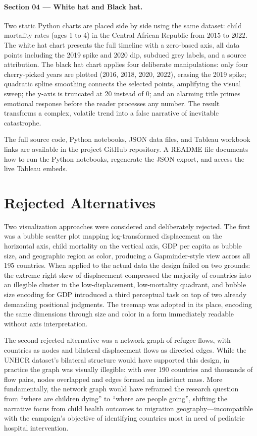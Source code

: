 \documentclass{article}
\begin{document}
\paragraph{Section 04 --- White hat and Black hat.}
Two static Python charts are placed side by side using the same dataset: child mortality rates (ages 1 to 4) in the Central African Republic from 2015 to 2022. The white hat chart presents the full timeline with a zero-based axis, all data points including the 2019 spike and 2020 dip, subdued grey labels, and a source attribution. The black hat chart applies four deliberate manipulations: only four cherry-picked years are plotted (2016, 2018, 2020, 2022), erasing the 2019 spike; quadratic spline smoothing connects the selected points, amplifying the visual sweep; the y-axis is truncated at 20 instead of 0; and an alarming title primes emotional response before the reader processes any number. The result transforms a complex, volatile trend into a false narrative of inevitable catastrophe.

The full source code, Python notebooks, JSON data files, and Tableau workbook links are available in the project GitHub repository. A README file documents how to run the Python notebooks, regenerate the JSON export, and access the live Tableau embeds.

\section{Rejected Alternatives}

Two visualization approaches were considered and deliberately rejected. The first was a bubble scatter plot mapping log-transformed displacement on the horizontal axis, child mortality on the vertical axis, GDP per capita as bubble size, and geographic region as color, producing a Gapminder-style view across all 195 countries. When applied to the actual data the design failed on two grounds: the extreme right skew of displacement compressed the majority of countries into an illegible cluster in the low-displacement, low-mortality quadrant, and bubble size encoding for GDP introduced a third perceptual task on top of two already demanding positional judgments. The treemap was adopted in its place, encoding the same dimensions through size and color in a form immediately readable without axis interpretation.

The second rejected alternative was a network graph of refugee flows, with countries as nodes and bilateral displacement flows as directed edges. While the UNHCR dataset's bilateral structure would have supported this design, in practice the graph was visually illegible: with over 190 countries and thousands of flow pairs, nodes overlapped and edges formed an indistinct mass. More fundamentally, the network graph would have reframed the research question from ``where are children dying'' to ``where are people going'', shifting the narrative focus from child health outcomes to migration geography---incompatible with the campaign's objective of identifying countries most in need of pediatric hospital intervention.
\end{document}
